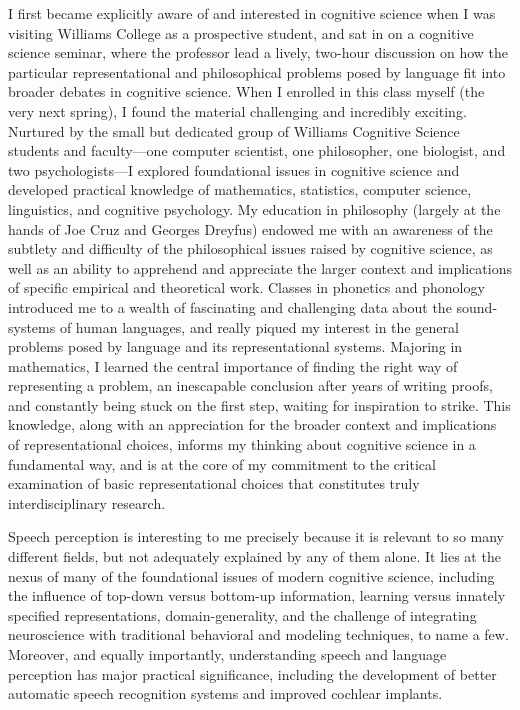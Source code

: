 \documentclass[12pt]{article}
\begin{document}



I first became explicitly aware of and interested in cognitive science when I was visiting Williams College as a prospective student, and sat in on a cognitive science seminar, where the professor lead a lively, two-hour discussion on how the particular representational and philosophical problems posed by language fit into broader debates in cognitive science.  When I enrolled in this class myself (the very next spring), I found the material challenging and incredibly exciting.  Nurtured by the small but dedicated group of Williams Cognitive Science students and faculty---one computer scientist, one philosopher, one biologist, and two psychologists---I explored foundational issues in cognitive science and developed practical knowledge of mathematics, statistics, computer science, linguistics, and cognitive psychology.  My education in philosophy (largely at the hands of Joe Cruz and Georges Dreyfus) endowed me with an awareness of the subtlety and difficulty of the philosophical issues raised by cognitive science, as well as an ability to apprehend and appreciate the larger context and implications of specific empirical and theoretical work.  Classes in phonetics and phonology introduced me to a wealth of fascinating and challenging data about the sound-systems of human languages, and really piqued my interest in the general problems posed by language and its representational systems.  Majoring in mathematics, I learned the central importance of finding the right way of representing a problem, an inescapable conclusion after years of writing proofs, and constantly being stuck on the first step, waiting for inspiration to strike.  This knowledge, along with an appreciation for the broader context and implications of representational choices, informs my thinking about cognitive science in a fundamental way, and is at the core of my commitment to the critical examination of basic representational choices that constitutes truly interdisciplinary research. 

Speech perception is interesting to me precisely because it is relevant to so many different fields, but not adequately explained by any of them alone.  It lies at the nexus of many of the foundational issues of modern cognitive science, including the influence of top-down versus bottom-up information, learning versus innately specified representations, domain-generality, and the challenge of integrating neuroscience with traditional behavioral and modeling techniques, to name a few.  Moreover, and equally importantly, understanding speech and language perception has major practical significance, including the development of better automatic speech recognition systems and improved cochlear implants.
\end{document}
